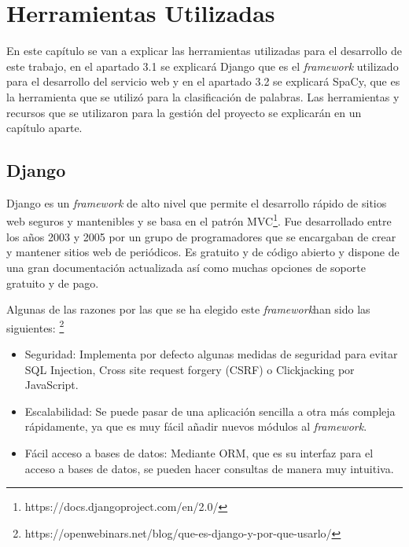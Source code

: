\chapter{Herramientas Utilizadas}
\label{cap:herramientas}

En este capítulo se van a explicar las herramientas utilizadas para el desarrollo de este trabajo, en el apartado 3.1 se explicará Django que es el \textit{framework} utilizado para el desarrollo del servicio web y en el apartado 3.2 se explicará SpaCy, que es la herramienta que se utilizó para la clasificación de palabras. Las herramientas y recursos que se utilizaron para la gestión del proyecto se explicarán en un capítulo aparte.


\section{Django}
\label{cap:sec:django}
Django es un \textit{framework} de alto nivel que permite el desarrollo rápido de sitios web seguros y mantenibles y se basa en el patrón MVC\footnote{https://docs.djangoproject.com/en/2.0/}. Fue desarrollado entre los años 2003 y 2005 por un grupo de programadores que se encargaban de crear y mantener sitios web de periódicos. 
Es gratuito y de código abierto y dispone de una gran documentación actualizada así como muchas opciones de soporte gratuito y de pago. 

Algunas de las razones por las que se ha elegido este \textit{framework}han sido las siguientes:
\footnote{https://openwebinars.net/blog/que-es-django-y-por-que-usarlo/}
\begin{itemize}
	\item Seguridad: Implementa por defecto algunas medidas de seguridad para evitar SQL Injection, Cross site request forgery (CSRF) o Clickjacking por JavaScript.
	
	\item Escalabilidad: Se puede pasar de una aplicación sencilla a otra más compleja rápidamente, ya que es muy fácil añadir nuevos módulos al \textit{framework}.
	
	\item Fácil acceso a bases de datos: Mediante ORM, que es su interfaz para el acceso a bases de datos, se pueden hacer consultas de manera muy intuitiva.
	
\end{itemize}

